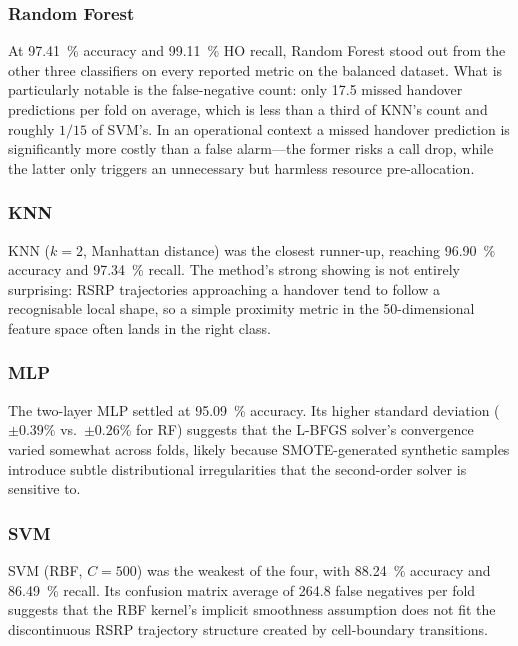 \documentclass[journal]{IEEEtran}
\begin{document}
\subsubsection{Random Forest}

At \SI{97.41}{\percent} accuracy and \SI{99.11}{\percent} HO recall,
Random Forest stood out from the other three classifiers on every
reported metric on the balanced dataset. What is particularly notable is
the false-negative count: only 17.5 missed handover predictions per fold
on average, which is less than a third of KNN's count and roughly
$1/15$ of SVM's. In an operational context a missed handover prediction
is significantly more costly than a false alarm---the former risks a call
drop, while the latter only triggers an unnecessary but harmless resource
pre-allocation.

\subsubsection{KNN}

KNN ($k=2$, Manhattan distance) was the closest runner-up, reaching
\SI{96.90}{\percent} accuracy and \SI{97.34}{\percent} recall. The
method's strong showing is not entirely surprising: RSRP trajectories
approaching a handover tend to follow a recognisable local shape, so a
simple proximity metric in the 50-dimensional feature space often lands
in the right class.

\subsubsection{MLP}

The two-layer MLP settled at \SI{95.09}{\percent} accuracy. Its
higher standard deviation ($\pm0.39\%$ vs.\ $\pm0.26\%$ for RF) suggests
that the L-BFGS solver's convergence varied somewhat across folds,
likely because SMOTE-generated synthetic samples introduce subtle
distributional irregularities that the second-order solver is sensitive to.

\subsubsection{SVM}

SVM (RBF, $C=500$) was the weakest of the four, with \SI{88.24}{\percent}
accuracy and \SI{86.49}{\percent} recall. Its confusion matrix average
of 264.8 false negatives per fold suggests that the RBF kernel's
implicit smoothness assumption does not fit the discontinuous RSRP
trajectory structure created by cell-boundary transitions.
\end{document}
